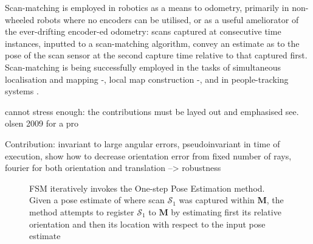 Scan-matching is employed in robotics as a means to odometry,
primarily in non-wheeled robots where no encoders can be utilised, or as a
useful ameliorator of the ever-drifting encoder-ed odometry: scans captured at
consecutive time instances, inputted to a scan-matching algorithm, convey an
estimate as to the pose of the scan sensor at the second capture time
relative to that captured first. Scan-matching is being successfully employed
in the tasks of simultaneous localisation and mapping
\cite{am_odom_1}-\cite{am_odom_3}, local map construction
\cite{am_odom_4}-\cite{am_odom_6}, and in people-tracking systems
\cite{am_odom_7}.

cannot stress enough: the contributions must be layed out and emphasised
see. olsen 2009 for a pro

Contribution: invariant to large angular errors, pseudoinvariant in time of execution, show how to decrease orientation error from fixed number of rays, fourier for both orientation and translation --> robustness






\begin{figure}[]\centering
  
  \caption{\small FSM iteratively invokes the One-step Pose Estimation method.
           Given a pose estimate of where scan $\mathcal{S}_1$ was captured
           within $\bm{M}$, the method attempts to register $\mathcal{S}_1$ to
           $\bm{M}$ by estimating first its relative orientation and then its
           location with respect to the input pose estimate}
  \label{fig:fsm_inner}
\end{figure}
